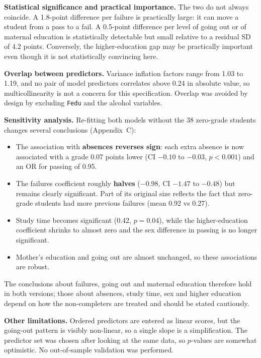 \documentclass[11pt,a4paper]{article}
\begin{document}
\textbf{Statistical significance and practical importance.} The two do not always coincide. A 1.8-point difference per failure is practically large: it can move a student from a pass to a fail. A 0.5-point difference per level of going out or of maternal education is statistically detectable but small relative to a residual SD of 4.2 points. Conversely, the higher-education gap may be practically important even though it is not statistically convincing here.

\textbf{Overlap between predictors.} Variance inflation factors range from 1.03 to 1.19, and no pair of model predictors correlates above 0.24 in absolute value, so multicollinearity is not a concern for this specification. Overlap was avoided by design by excluding \texttt{Fedu} and the alcohol variables.

\textbf{Sensitivity analysis.} Re-fitting both models without the 38 zero-grade students changes several conclusions (Appendix~C):
\begin{itemize}
\item The association with \textbf{absences reverses sign}: each extra absence is now associated with a grade 0.07 points lower (CI $-0.10$ to $-0.03$, $p < 0.001$) and an OR for passing of 0.95.
\item The failures coefficient roughly \textbf{halves} ($-0.98$, CI $-1.47$ to $-0.48$) but remains clearly significant. Part of its original size reflects the fact that zero-grade students had more previous failures (mean 0.92 vs 0.27).
\item Study time becomes significant (0.42, $p = 0.04$), while the higher-education coefficient shrinks to almost zero and the sex difference in passing is no longer significant.
\item Mother's education and going out are almost unchanged, so these associations are robust.
\end{itemize}
The conclusions about failures, going out and maternal education therefore hold in both versions; those about absences, study time, sex and higher education depend on how the non-completers are treated and should be stated cautiously.

\textbf{Other limitations.} Ordered predictors are entered as linear scores, but the going-out pattern is visibly non-linear, so a single slope is a simplification. The predictor set was chosen after looking at the same data, so $p$-values are somewhat optimistic. No out-of-sample validation was performed.

\end{document}
